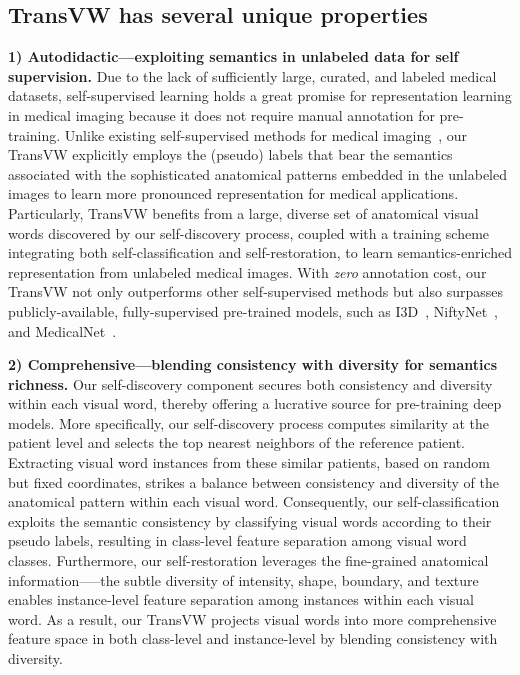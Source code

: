 \documentclass[journal,twoside,web]{ieeecolor}
\begin{document}
\subsection{TransVW has several unique properties}

\noindent\textbf{1) Autodidactic---exploiting semantics in unlabeled data for self supervision.} 
Due to the lack of sufficiently large, curated, and labeled medical datasets, self-supervised learning holds a great promise for representation learning in medical imaging because it does not require manual annotation for pre-training. Unlike existing self-supervised methods for medical imaging~\cite{chen2019self,Zhuang2019Self,zhou2019models}, our TransVW explicitly employs the (pseudo) labels that bear the semantics associated with the sophisticated anatomical patterns embedded in the unlabeled images to learn more pronounced representation for medical applications. Particularly, TransVW benefits from  a large, diverse set of anatomical visual words discovered by our self-discovery process, coupled with a training scheme integrating both self-classification and self-restoration, to learn semantics-enriched representation from unlabeled medical images. With \textit{zero} annotation cost, our TransVW not only outperforms other self-supervised methods but also surpasses publicly-available, fully-supervised pre-trained models, such as I3D~\cite{carreira2017quo}, NiftyNet~\cite{gibson2018niftynet}, and MedicalNet~\cite{chen2019med3d}.


\medskip
\noindent\textbf{2) Comprehensive---blending consistency with diversity for semantics richness.}
Our self-discovery component secures both consistency and diversity within each visual word, thereby offering a lucrative source for pre-training deep models. More specifically, our self-discovery process computes similarity at the patient level and selects the top nearest neighbors of the reference patient. Extracting visual word instances from these similar patients, based on random but fixed coordinates, strikes a balance between consistency and diversity of the anatomical pattern within each visual word. Consequently, our self-classification exploits the semantic consistency by classifying visual words according to their pseudo labels, resulting in class-level feature separation among visual word classes. Furthermore, our self-restoration leverages the fine-grained anatomical information—--the subtle diversity of intensity, shape, boundary, and texture enables instance-level feature separation among instances within each visual word. As a result, our TransVW projects visual words into more comprehensive feature space in both class-level and instance-level by blending consistency with diversity.
\end{document}
